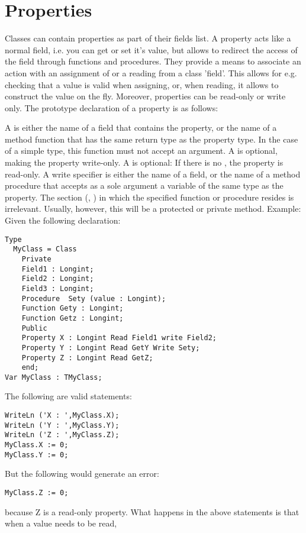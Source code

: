 \documentclass{report}
\begin{document}
\section{Properties}
Classes can contain properties as part of their fields list. A property
acts like a normal field, i.e. you can get or set it's value, but
allows to redirect the access of the field through functions and
procedures. They provide a means to associate an action with an assignment
of or a reading from a class 'field'. This allows for e.g. checking that a
value is valid when assigning, or, when reading, it allows to construct the
value on the fly. Moreover, properties can be read-only or write only.
The prototype declaration of a property is as follows:

A  is either the name of a field that contains the
property, or the name of a method function that has the same return type as
the property type. In the case of a simple type, this
function must not accept an argument. A  is optional, 
making the property write-only.
A  is optional: If there is no , the
property is read-only. A write specifier is either the name of a field, or
the name of a method procedure that accepts as a sole argument a variable of
the same type as the property.
The section (, ) in which the specified function or
procedure resides is irrelevant. Usually, however, this will be a protected
or private method.
Example:
Given the following declaration:
\begin{verbatim}
Type
  MyClass = Class
    Private
    Field1 : Longint;
    Field2 : Longint;
    Field3 : Longint;
    Procedure  Sety (value : Longint);
    Function Gety : Longint;
    Function Getz : Longint;
    Public
    Property X : Longint Read Field1 write Field2;
    Property Y : Longint Read GetY Write Sety;
    Property Z : Longint Read GetZ;
    end;
Var MyClass : TMyClass;
\end{verbatim}
The following are valid statements:
\begin{verbatim}
WriteLn ('X : ',MyClass.X);
WriteLn ('Y : ',MyClass.Y);
WriteLn ('Z : ',MyClass.Z);
MyClass.X := 0;
MyClass.Y := 0;
\end{verbatim}
But the following would generate an error:
\begin{verbatim}
MyClass.Z := 0;
\end{verbatim}
because Z is a read-only property.
What happens in the above statements is that when a value needs to be read,
\end{document}
